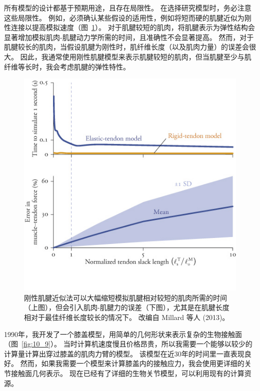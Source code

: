 所有模型的设计都基于预期用途，且存在局限性。
在选择研究模型时，务必注意这些局限性。
例如，必须确认某些假设的适用性，例如将短而硬的肌腱近似为刚性连接以提高模拟速度（图~\ref{fig:10_8}）。
对于肌腱较短的肌肉，将肌腱表示为弹性结构会显著增加模拟肌肉-肌腱动力学所需的时间，且准确性不会显著提高。
然而，对于肌腱较长的肌肉，当假设肌腱为刚性时，肌纤维长度（以及肌肉力量）的误差会很大。
因此，我通常使用刚性肌腱模型来表示肌腱较短的肌肉，但当肌腱至少与肌纤维等长时，我会考虑肌腱的弹性特性。

\begin{figure}[!htb]
	\centering
	\includegraphics[width=0.8\linewidth]{chap10/10_8}
	\caption{刚性肌腱近似法可以大幅缩短模拟肌腱相对较短的肌肉所需的时间（上图），但会引入肌肉-肌腱力的误差（下图），尤其是在肌腱长度相对于最佳纤维长度较长的情况下。
		改编自 Millard 等人 (2013)。 \label{fig:10_8}}
\end{figure}

1990年，我开发了一个膝盖模型，用简单的几何形状来表示复杂的生物接触面（图~\ref{fig:10_9}）。
当时计算机速度慢且价格昂贵，所以我需要一个能够以较少的计算量计算出穿过膝盖的肌肉力臂的模型。
该模型在近30年的时间里一直表现良好。
然而，如果我需要一个模型来计算膝盖内的接触应力，我会使用更详细的关节接触面几何表示。
现在已经有了详细的生物关节模型，可以利用现有的计算资源。


